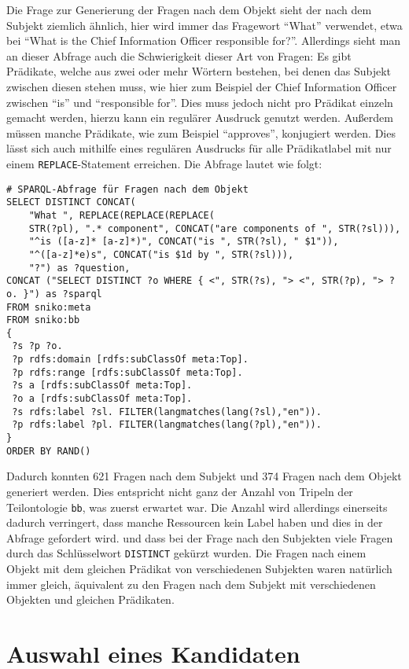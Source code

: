 Die Frage zur Generierung der Fragen nach dem Objekt sieht der nach dem Subjekt ziemlich ähnlich, hier wird immer das Fragewort \enquote{What} verwendet, etwa bei \enquote{What is the Chief Information Officer responsible for?}.
Allerdings sieht man an dieser Abfrage auch die Schwierigkeit dieser Art von Fragen:
Es gibt Prädikate, welche aus zwei oder mehr Wörtern bestehen, bei denen das Subjekt zwischen diesen stehen muss, wie hier zum Beispiel der Chief Information Officer zwischen \enquote{is} und \enquote{responsible for}.
Dies muss jedoch nicht pro Prädikat einzeln gemacht werden, hierzu kann ein regulärer Ausdruck genutzt werden.
Außerdem müssen manche Prädikate, wie zum Beispiel \enquote{approves}, konjugiert werden.
Dies lässt sich auch mithilfe eines regulären Ausdrucks für alle Prädikatlabel mit nur einem \texttt{REPLACE}-Statement erreichen.
Die Abfrage lautet wie folgt:
\begin{lstlisting}[language=SPARQL]
# SPARQL-Abfrage für Fragen nach dem Objekt
SELECT DISTINCT CONCAT(
    "What ", REPLACE(REPLACE(REPLACE(
    STR(?pl), ".* component", CONCAT("are components of ", STR(?sl))),
    "^is ([a-z]* [a-z]*)", CONCAT("is ", STR(?sl), " $1")),
    "^([a-z]*e)s", CONCAT("is $1d by ", STR(?sl))),
    "?") as ?question,
CONCAT ("SELECT DISTINCT ?o WHERE { <", STR(?s), "> <", STR(?p), "> ?o. }") as ?sparql
FROM sniko:meta
FROM sniko:bb
{
 ?s ?p ?o.
 ?p rdfs:domain [rdfs:subClassOf meta:Top].
 ?p rdfs:range [rdfs:subClassOf meta:Top].
 ?s a [rdfs:subClassOf meta:Top].
 ?o a [rdfs:subClassOf meta:Top].
 ?s rdfs:label ?sl. FILTER(langmatches(lang(?sl),"en")).
 ?p rdfs:label ?pl. FILTER(langmatches(lang(?pl),"en")).
}
ORDER BY RAND()
\end{lstlisting}

Dadurch konnten 621 Fragen nach dem Subjekt und 374 Fragen nach dem Objekt generiert werden.
Dies entspricht nicht ganz der Anzahl von Tripeln der Teilontologie \texttt{bb}, was zuerst erwartet war.
Die Anzahl wird allerdings einerseits dadurch verringert, dass manche Ressourcen kein Label haben und dies in der Abfrage gefordert wird.
und dass bei der Frage nach den Subjekten viele Fragen durch das Schlüsselwort \texttt{DISTINCT} gekürzt wurden.
Die Fragen nach einem Objekt mit dem gleichen Prädikat von verschiedenen Subjekten waren natürlich immer gleich,
äquivalent zu den Fragen nach dem Subjekt mit verschiedenen Objekten und gleichen Prädikaten.

\section{Auswahl eines Kandidaten}

